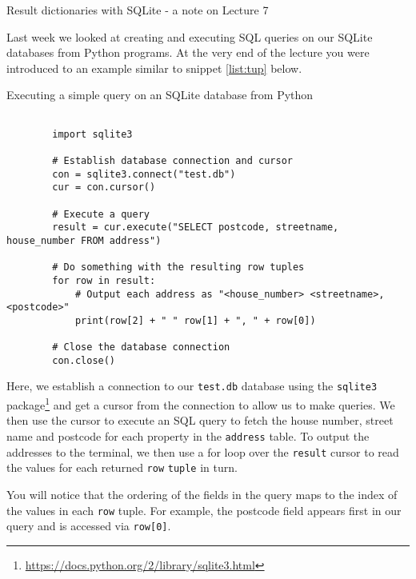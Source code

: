 \documentclass[a4paper]{article}
\begin{document}

\begin{center}
{\huge{Result dictionaries with SQLite - a note on Lecture 7}}
\noindent\makebox[\linewidth]{\rule{\paperwidth}{0.4pt}}
\end{center}

\vskip 0.5cm

Last week we looked at creating and executing SQL queries on our SQLite databases
from Python programs. At the very end of the lecture you were introduced to an
example similar to snippet \ref{list:tup} below.

\begin{listing}[H]
    \caption[]{Executing a simple query on an SQLite database from Python}
    \label{list:tup}
    \begin{verbatim}

        import sqlite3

        # Establish database connection and cursor
        con = sqlite3.connect("test.db")
        cur = con.cursor()

        # Execute a query
        result = cur.execute("SELECT postcode, streetname, house_number FROM address")

        # Do something with the resulting row tuples
        for row in result:
            # Output each address as "<house_number> <streetname>, <postcode>"
            print(row[2] + " " row[1] + ", " + row[0])

        # Close the database connection
        con.close()

    \end{verbatim}
\end{listing}

Here, we establish a connection to our \texttt{test.db} database using the
\texttt{sqlite3} package\footnote{{\href{https://docs.python.org/2/library/sqlite3.html}{https://docs.python.org/2/library/sqlite3.html}}}
and get a cursor from the connection to allow us to make queries. We then use
the cursor to execute an SQL query to fetch the house number, street name
and postcode for each property in the \texttt{address} table. To output the
addresses to the terminal, we then use a for loop over the \texttt{result} cursor
to read the values for each returned \texttt{row} \texttt{tuple} in turn.

You will notice that the ordering of the fields in the query maps to the index
of the values in each \texttt{row} tuple. For example, the postcode field appears
first in our query and is accessed via \texttt{row[0]}.
\end{document}
